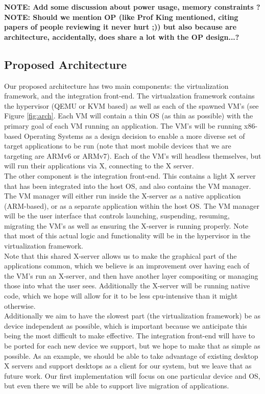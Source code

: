 {\bf NOTE: Add some discussion about power usage, memory constraints ? \newline}
{\bf NOTE: Should we mention OP (like Prof King mentioned, citing papers of people reviewing it never hurt ;)) but also because are architecture, accidentally, does share a lot with the OP design...?}

\subsection{Proposed Architecture}
\label{sec:proposedarch}
Our proposed architecture has two main components: the virtualization framework, and the integration front-end.  The virtualzation framework contains the hypervisor (QEMU or KVM based) as well as each of the spawned VM's (see Figure \ref{fig:arch}.  Each VM will contain a thin OS (as thin as possible) with the primary goal of each VM running an application.  The VM's will be running x86-based Operating Systems as a design decision to enable a more diverse set of target applications to be run (note that most mobile devices that we are targeting are ARMv6 or ARMv7).  Each of the VM's will headless themselves, but will run their applications via X, connecting to the X server. \\

The other component is the integration front-end.  This contains a light X server that has been integrated into the host OS, and also contains the VM manager.  The VM manager will either run inside the X-server as a native application (ARM-based), or as a separate application within the host OS.  The VM manager will be the user interface that controls launching, suspending, resuming, migrating the VM's as well as ensuring the X-server is running properly. Note that most of this actual logic and functionality will be in the hypervisor in the virtualization framework.\\

Note that this shared X-server allows us to make the graphical part of the applications common, which we believe is an improvement over having each of the VM's run an X-server, and then have another layer compositing or managing those into what the user sees.  Additionally the X-server will be running native code, which we hope will allow for it to be less cpu-intensive than it might otherwise. \\

Additionally we aim to have the slowest part (the virtualization framework) be as device independent as possible, which is important because we anticipate this being the most difficult to make effective.  The integration front-end will have to be ported for each new device we support, but we hope to make that as simple as possible.  As an example, we should be able to take advantage of existing desktop X servers and support desktops as a client for our system, but we leave that as future work.  Our first implementation will focus on one particular device and OS, but even there we will be able to support live migration of applications. \\
